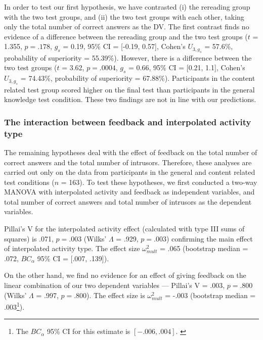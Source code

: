 \documentclass[11pt,]{article}
\let\rmarkdownfootnote\footnote%
\def\footnote{\protect\rmarkdownfootnote}
\begin{document}
In order to test our first hypothesis, we have contrasted (i) the
rereading group with the two test groups, and (ii) the two test groups
with each other, taking only the total number of correct answers as the
DV. The first contrast finds no evidence of a difference between the
rereading group and the two test groups (\(t\) = 1.355, \(p = .178\),
\(g_s\) = 0.19, 95\% CI = {[}-0.19, 0.57{]}, Cohen's \(U_{3, g_s}\) =
57.6\%, probability of superiority = 55.39\%). However, there is a
difference between the two test groups (\(t\) = 3.62, \(p = .0004\),
\(g_s\) = 0.66, 95\% CI = {[}0.21, 1.1{]}, Cohen's \(U_{3, g_s}\) =
74.43\%, probability of superiority = 67.88\%). Participants in the
content related test group scored higher on the final test than
participants in the general knowledge test condition. These two findings
are not in line with our predictions.

\hypertarget{the-interaction-between-feedback-and-interpolated-activity-type}{%
\subsubsection{The interaction between feedback and interpolated
activity
type}\label{the-interaction-between-feedback-and-interpolated-activity-type}}

The remaining hypotheses deal with the effect of feedback on the total
number of correct answers and the total number of intrusors. Therefore,
these analyses are carried out only on the data from participants in the
general and content related test conditions (\(n\) = 163). To test these
hypotheses, we first conducted a two-way MANOVA with interpolated
activity and feedback as independent variables, and total number of
correct answers and total number of intrusors as the dependent
variables.

Pillai's V for the interpolated activity effect (calculated with type
III sums of squares) is .071, \(p = .003\) (Wilks' \(\Lambda\) = .929,
\(p = .003\)) confirming the main effect of interpolated activity type.
The effect size \(\omega^2_{mult}\) = .065 (bootstrap median = .072,
\(BC_\alpha\) 95\% CI = {[}.007, .139{]}).

On the other hand, we find no evidence for an effect of giving feedback
on the linear combination of our two dependent variables --- Pillai's V
= .003, \(p = .800\) (Wilks' \(\Lambda\) = .997, \(p = .800\)). The
effect size is \(\omega^2_{mult}\) = -.003 (bootstrap median =
.003\footnote{
The \(BC_\alpha\) 95\% CI for this estimate is \([-.006,
.004]\).
\label{bca-ref}}).
\end{document}
